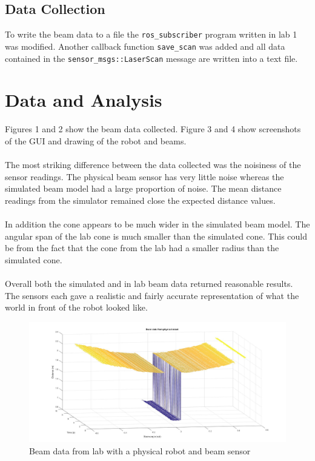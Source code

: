 \documentclass[letterpaper,12pt]{article}
\begin{document}
\subsection{Data Collection}
To write the beam data to a file the \texttt{ros\_subscriber} program written in lab 1 was modified. Another callback function \texttt{save\_scan} was added and all data contained in the \texttt{sensor\_msgs::LaserScan} message are written into a text file.

\section{Data and Analysis}
Figures 1 and 2 show the beam data collected. Figure 3 and 4 show screenshots of the GUI and drawing of the robot and beams.
\\\\
The most striking difference between the data collected was the noisiness of the sensor readings. The physical beam sensor has very little noise whereas the simulated beam model had a large proportion of noise. The mean distance readings from the simulator remained close the expected distance values. 
\\\\
In addition the cone appears to be much wider in the simulated beam model. The angular span of the lab cone is much smaller than the simulated cone. This could be from the fact that the cone from the lab had a smaller radius than the simulated cone. 
\\\\
Overall both the simulated and in lab beam data returned reasonable results. The sensors each gave a realistic and fairly accurate representation of what the world in front of the robot looked like.  
\begin{figure}
	\centering
	\includegraphics[width=.9\textwidth]{beamlab.jpg}\hfill
	\caption{Beam data from lab with a physical robot and beam sensor}
\end{figure}
\end{document}
